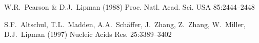 \begin{frame}
\begin{minipage}[t]{.65\textwidth}
\begin{description}\raggedright{}
\item[\wscgo{FastA}] W.R.~Pearson \& D.J.~Lipman (1988) Proc. Natl. Acad. Sci.
USA 85:2444--2448
\item[\wscgo{BLAST}] S.F.~Altschul, T.L.~Madden, A.A.~Sch\"{a}ffer, J.~Zhang,
Z.~Zhang, W.~Miller, D.J.~Lipman (1997) Nucleic Acids Res.
25:3389--3402
\end{description}
\end{minipage}\vfill~

\end{frame}


